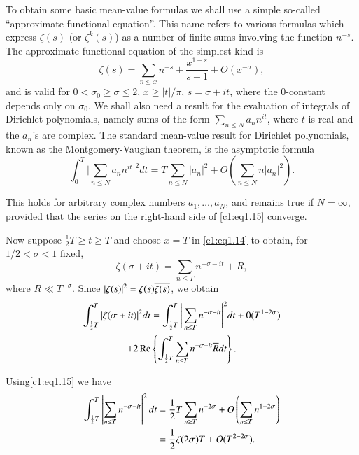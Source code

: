 To obtain some basic mean-value formulas we shall use a simple
so-called ``approximate functional equation''. This name refers to
various formulas which express $\zeta (s)$ (or $\zeta^k(s)$) as a
number of finite sums involving the function $n^{-s}$. The approximate
functional equation of the simplest kind is 
\begin{equation}
  \zeta (s) = \sum_{n \leq x}n^{-s} + \frac{x^{1-s}}{s-1} + O
  (x^{-\sigma}),\label{c1:eq1.14} 
\end{equation}
and is valid for $0 < \sigma_0 \geq \sigma \leq 2$, $x \geq |t| /\pi$,
$s= \sigma + it $, where the 0-constant depends only on
$\sigma_0$. We shall also need a result for the evaluation of
integrals of Dirichlet polynomials, namely sums of the form
$\displaystyle{\sum_{n \leq N} a_nn^{it }}$, where $t$ is real
and the $a_n$'s are complex. The standard mean-value result for
Dirichlet polynomials, known as the Montgomery-Vaug\-han theorem, is the
asymptotic formula
\begin{equation}
  \int^T_0 \Bigg| \sum_{n \leq N}a_n n^{it } \Bigg|^2 dt = T
  \sum_{n \leq N} |a_n|^2+ O \left( \sum_{n \leq N} n|a_n
  |^2\right).\label{c1:eq1.15} 
\end{equation}

This holds for arbitrary complex numbers $a_1 , \ldots , a_N$, and
remains true if $N= \infty$, provided that the series on the
right-hand side of \eqref{c1:eq1.15} converge.

Now suppose $\frac{1}{2} T \geq t \geq T$ and choose $x=T$ in
\eqref{c1:eq1.14} to obtain, for $1/2< \sigma < 1$ fixed,
$$
\zeta(\sigma + it ) = \sum_{n \leq T} n^{- \sigma - it }+ R, 
$$
where $R \ll T^{- \sigma}$. Since $|\zeta (s)|^2= \zeta (s)
\overline{\zeta(s)}$, we obtain 
\begin{multline*}
  \int^T_{\frac{1}{2} T} |\zeta (\sigma + it )|^2 dt =
  \int^T_{\frac{1}{2} T} \Bigg|\sum_{n \leq T}n^{- \sigma -
    it } \Bigg|^2 dt + 0(T^{1-2 \sigma})\\
  + 2 \operatorname{Re} \left\{\int^T_{\frac{1}{2} T} \sum_{n \leq T} n^{- \sigma -
    it }\overline{R} dt \right\}.
\end{multline*}

Using\pageoriginale \eqref{c1:eq1.15} we have
\begin{align}
  \int^T_{\frac{1}{2}T} \left| \sum_{n \leq T} n^{- \sigma -
    it } \right|^2 dt & = \frac{1}{2} T \sum_{n \geq T} n^{- 2
    \sigma}+ O \left( \sum_{n \leq T} n^{1 - 2 \sigma}\right)\label{c1:eq1.16} \\
  & = \frac{1}{2} \zeta (2 \sigma) T+ O (T^{2- 2 \sigma}).\notag
\end{align}

